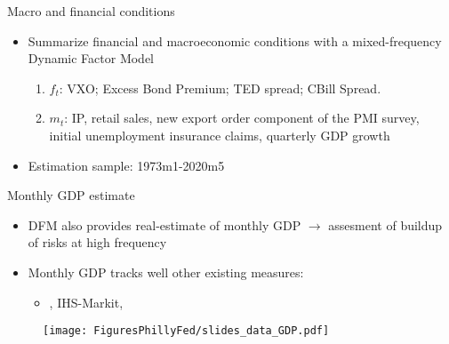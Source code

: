 \documentclass[xcolor=dvipsnames, xcolor=table, 10pt]{beamer}
\begin{document}

\begin{frame}{Macro and financial conditions}
\begin{itemize}
    \item Summarize financial and macroeconomic conditions with a mixed-frequency Dynamic Factor Model \cite{AruobaDieboldScotti2009}
    \medskip
    \begin{enumerate}
    	\item $f_t$: VXO; Excess Bond Premium; TED spread; CBill Spread.\medskip
    	\item $m_t$: IP, retail sales, new export order component of the PMI survey, initial unemployment insurance claims, quarterly GDP growth
    \end{enumerate}
    \medskip
    \item {Estimation} sample: 1973m1-2020m5
\end{itemize}

\begin{figure}
     \par
\end{figure}

\end{frame}


\begin{frame}{Monthly GDP estimate}
\begin{itemize}
\item DFM also provides real-estimate of monthly GDP $\rightarrow$ assesment of buildup of risks at high frequency
\bigskip

\item Monthly GDP tracks well other existing measures:
\begin{itemize}
  \medskip
  \item \cite{stock1989new}, IHS-Markit, \cite{lewis2020us}
\end{itemize}

\end{itemize}

\begin{figure}
     \texttt{[image: FiguresPhillyFed/slides\_data\_GDP.pdf]}
\end{figure}

\end{frame}
\end{document}

